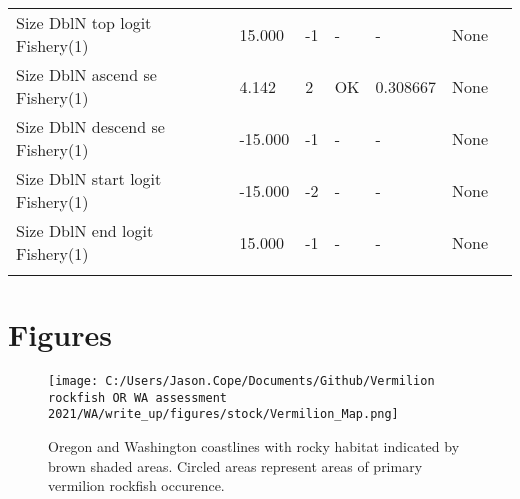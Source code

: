 \documentclass[11pt,
  english,
  a4paper,
]{article}
\begin{document}
\begin{landscape}
\begin{longtable}[t]{>{\raggedright\arraybackslash}p{6cm}lllll>{\raggedright\arraybackslash}p{4cm}}
Size DblN top logit Fishery(1) & 15.000 & -1 & - & - & None\\
Size DblN ascend se Fishery(1) & 4.142 & 2 & OK & 0.308667 & None\\
Size DblN descend se Fishery(1) & -15.000 & -1 & - & - & None\\
Size DblN start logit Fishery(1) & -15.000 & -2 & - & - & None\\
Size DblN end logit Fishery(1) & 15.000 & -1 & - & - & None\\*
\end{longtable}
\leavevmode\tagmcend\tagstructend\par
\endgroup{}
\end{landscape}
\endgroup{}





\newpage







\newpage



\newpage



\newpage



\clearpage

\clearpage


\hypertarget{figures}{%
\section{Figures}\label{figures}}

\leavevmode\tagmcend\tagstructend


\begin{figure}
\centering
\texttt{[image: C:/Users/Jason.Cope/Documents/Github/Vermilion rockfish OR WA assessment 2021/WA/write\_up/figures/stock/Vermilion\_Map.png]}
\caption{Oregon and Washington coastlines with rocky habitat indicated by brown shaded areas. Circled areas represent areas of primary vermilion rockfish occurence.\label{fig:ORWA-map}}
\end{figure}
\end{document}

